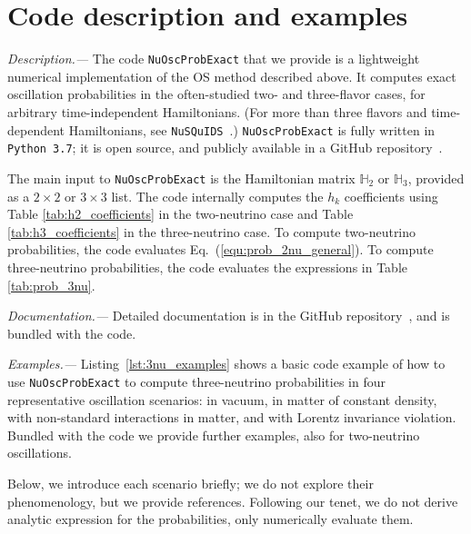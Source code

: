 \documentclass[final,5p,times,twocolumn]{elsarticle}
\newcommand{\eq}{Eq.}
\newcommand{\equ}[1]{\eq~(\ref{equ:#1})}
\begin{document}


\section{Code description and examples}
\label{section:code}

{\it Description.---}  The code {\tt NuOscProbExact} that we provide is a lightweight numerical implementation of the OS method described above.  It computes exact oscillation probabilities in the often-studied two- and three-flavor cases, for arbitrary time-independent Hamiltonians.  (For more than three flavors and time-dependent Hamiltonians, see {\tt NuSQuIDS}\ \cite{NuSQuIDS}.)   {\tt NuOscProbExact} is fully written in {\tt Python 3.7}; it is open source, and publicly available in a GitHub repository\ \cite{NuOscProbExact}.  

The main input to {\tt NuOscProbExact} is the Hamiltonian matrix $\mathbb{H}_2$ or $\mathbb{H}_3$, provided as a $2 \times 2$ or $3 \times 3$ list.  The code internally computes the $h_k$ coefficients using Table \ref{tab:h2_coefficients} in the two-neutrino case and Table \ref{tab:h3_coefficients} in the three-neutrino case.  To compute two-neutrino probabilities, the code evaluates \equ{prob_2nu_general}.  To compute three-neutrino probabilities, the code evaluates the expressions in Table \ref{tab:prob_3nu}.  

\smallskip

{\it Documentation.---}  Detailed documentation is in the GitHub repository\ \cite{NuOscProbExact}, and is bundled with the code.

\smallskip

{\it Examples.---}  Listing\ \ref{lst:3nu_examples} shows a basic code example of how to use {\tt NuOscProbExact} to compute three-neutrino probabilities in four representative oscillation scenarios: in vacuum, in matter of constant density, with non-standard interactions in matter, and with Lorentz invariance violation.  Bundled with the code we provide further examples, also for two-neutrino oscillations.

Below, we introduce each scenario briefly; we do not explore their phenomenology, but we provide references.  Following our tenet, we do not derive analytic expression for the probabilities, only numerically evaluate them.  
\end{document}
